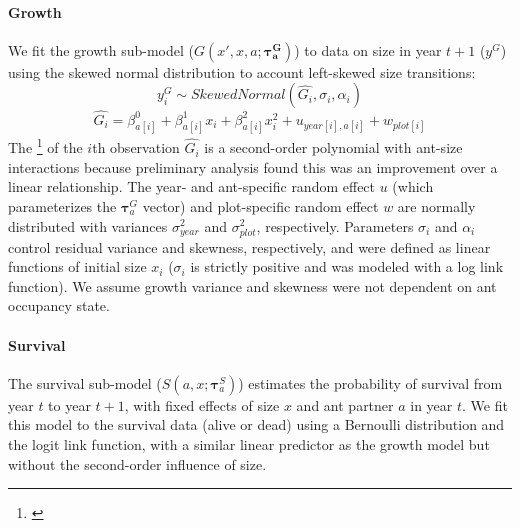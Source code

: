 \documentclass[11pt]{article}
\newcommand{\tom}[2]{{\color{red}{#1}}\footnote{\textit{\color{red}{#2}}}}
\begin{document}

\paragraph{Growth}
We fit the growth sub-model ($G(x',x,a;\pmb{\tau^G_{a}})$) to data on size in year $t+1$ ($y^G$) using the skewed normal distribution to account left-skewed size transitions:
$$y_i^G \sim Skewed Normal(\hat{G_i},\sigma_i,\alpha_i) $$
$$\hat{G_i} = \beta^0_{a[i]} + \beta^1_{a[i]} x_i + \beta^2_{a[i]} x_i^2 + u_{year[i],a[i]} + w_{plot[i]} $$
The \tom{mean}{I rewrote this for the skewed normal but I cannot remember if the location parameter is the mean, so you should double check this.} of the $i$th observation $\hat{G_i}$ is a second-order polynomial with ant-size interactions because  preliminary analysis found this was an improvement over a linear relationship. 
The year- and ant-specific random effect $u$ (which parameterizes the $\pmb{\tau}^G_{a}$ vector) and plot-specific random effect $w$ are normally distributed with variances $\sigma^2_{year}$ and $\sigma^2_{plot}$, respectively. 
Parameters $\sigma_i$ and $\alpha_i$  control residual variance and skewness, respectively, and were defined as linear functions of initial size $x_i$ ($\sigma_i$ is strictly positive and was modeled with a log link function). 
We assume growth variance and skewness were not dependent on ant occupancy state. 

\paragraph{Survival}
The survival sub-model ($S(a,x;\pmb{\tau}_{a}^{S})$) estimates the probability of survival from year $t$ to year $t+1$, with fixed effects of size $x$ and ant partner $a$ in year $t$.
We fit this model to the survival data (alive or dead) using a Bernoulli distribution and the logit link function, with a similar linear predictor as the growth model but without the second-order influence of size.
\end{document}
